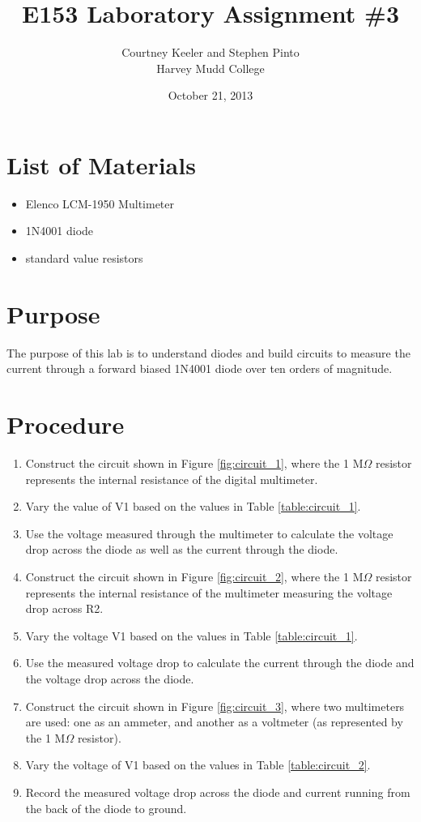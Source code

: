 \documentclass[12pt,letterpaper]{report}
\begin{document}
\title{E153 Laboratory Assignment \#3}
\author{Courtney Keeler and Stephen Pinto\\
Harvey Mudd College}
\date{October 21, 2013}
\maketitle

\section*{List of Materials}
\begin{itemize}
	\item Elenco LCM-1950 Multimeter
	\item 1N4001 diode
	\item standard value resistors
\end{itemize}

\section*{Purpose}
The purpose of this lab is to understand diodes and build circuits to measure the current through  a forward biased 1N4001 diode over ten orders of magnitude.

\section*{Procedure}

\begin{enumerate}
\item Construct the circuit shown in Figure \ref{fig:circuit_1}, where the 1 M$\Omega$ resistor represents the internal resistance of the digital multimeter.
\item Vary the value of V1 based on the values in Table \ref{table:circuit_1}.
\item Use the voltage measured through the multimeter to calculate the voltage drop across the diode as well as the current through the diode.
\item Construct the circuit shown in Figure \ref{fig:circuit_2}, where the 1 M$\Omega$ resistor represents the internal resistance of the multimeter measuring the voltage drop across R2.
\item Vary the voltage V1 based on the values in Table \ref{table:circuit_1}.
\item Use the measured voltage drop to calculate the current through the diode and the voltage drop across the diode.
\item Construct the circuit shown in Figure \ref{fig:circuit_3}, where two multimeters are used: one as an ammeter, and another as a voltmeter (as represented by the 1 M$\Omega$ resistor).
\item Vary the voltage of V1 based on the values in Table \ref{table:circuit_2}.
\item Record the measured voltage drop across the diode and current running from the back of the diode to ground.
\end{enumerate}
\end{document}
